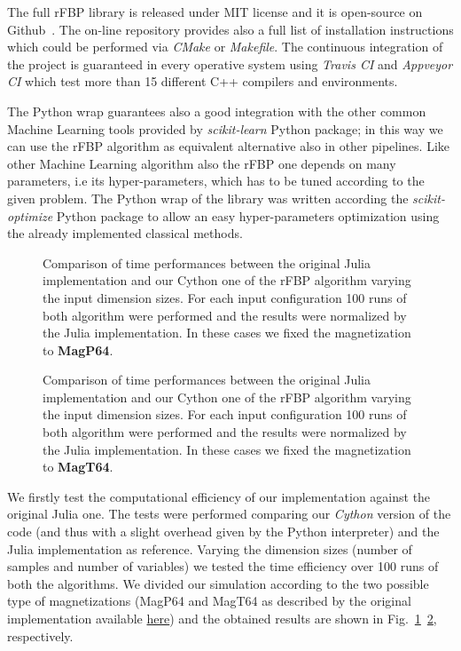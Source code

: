 \documentclass{standalone}
\begin{document}
The full rFBP library is released under MIT license and it is open-source on Github~\cite{ReplicatedFocusingBeliefPropagation}.
The on-line repository provides also a full list of installation instructions which could be performed via \emph{CMake} or \emph{Makefile}.
The continuous integration of the project is guaranteed in every operative system using \emph{Travis CI} and \emph{Appveyor CI} which test more than 15 different C++ compilers and environments.

The Python wrap guarantees also a good integration with the other common Machine Learning tools provided by \emph{scikit-learn} Python package; in this way we can use the rFBP algorithm as equivalent alternative also in other pipelines.
Like other Machine Learning algorithm also the rFBP one depends on many parameters, i.e its hyper-parameters, which has to be tuned according to the given problem.
The Python wrap of the library was written according the \emph{scikit-optimize} Python package to allow an easy hyper-parameters optimization using the already implemented classical methods.


\begin{figure}[htbp]
\centering
\def\svgwidth{0.85\textwidth}

\caption{Comparison of time performances between the original Julia implementation and our Cython one of the rFBP algorithm varying the input dimension sizes.
For each input configuration 100 runs of both algorithm were performed and the results were normalized by the Julia implementation.
In these cases we fixed the magnetization to \textbf{MagP64}.
}
\label{fig:rfbp_magp}
\end{figure}

\begin{figure}[htbp]
\centering
\def\svgwidth{0.85\textwidth}

\caption{Comparison of time performances between the original Julia implementation and our Cython one of the rFBP algorithm varying the input dimension sizes.
For each input configuration 100 runs of both algorithm were performed and the results were normalized by the Julia implementation.
In these cases we fixed the magnetization to \textbf{MagT64}.
}
\label{fig:rfbp_magt}
\end{figure}

We firstly test the computational efficiency of our implementation against the original Julia one.
The tests were performed comparing our \emph{Cython} version of the code (and thus with a slight overhead given by the Python interpreter) and the Julia implementation as reference.
Varying the dimension sizes (number of samples and number of variables) we tested the time efficiency over 100 runs of both the algorithms.
We divided our simulation according to the two possible type of magnetizations (MagP64 and MagT64 as described by the original implementation available \href{https://github.com/carlobaldassi/BinaryCommitteeMachineFBP.jl}{here}) and the obtained results are shown in Fig.~\ref{fig:rfbp_magp}~\ref{fig:rfbp_magt}, respectively.
\end{document}

